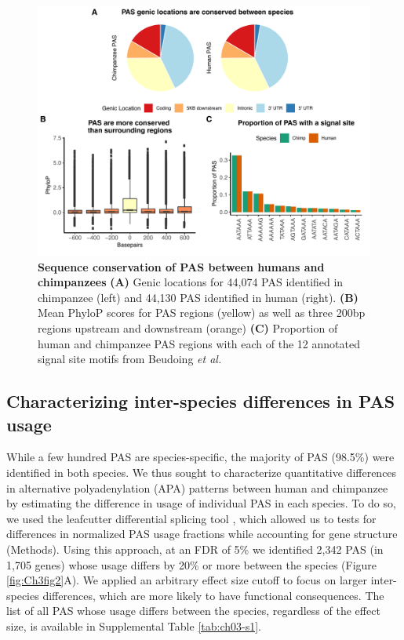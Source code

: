  
\begin{figure}
\centering
\includegraphics[width=5in]{img/ch03/fig1.pdf}
\caption[Sequence conservation of PAS between humans and chimpanzees]{\textbf{Sequence conservation of PAS between humans and chimpanzees} \small {\bf (A)} Genic locations for 44,074 PAS identified in chimpanzee (left) and 44,130 PAS identified in human (right). {\bf (B)} Mean PhyloP scores for PAS regions (yellow) as well as three 200bp regions upstream and downstream (orange) {\bf (C)} Proportion of human and chimpanzee PAS regions with each of the 12 annotated signal site motifs from Beudoing \emph{et al.}\citep{beaudoing_patterns_2000}} 
\label{fig:Ch3fig1}
\end{figure}
 
 
\subsection{Characterizing inter-species differences in PAS usage}\label{diffHC}

While a few hundred PAS are species-specific, the majority of PAS (98.5\%) were identified in both species. We thus sought to characterize quantitative differences in alternative polyadenylation (APA) patterns between human and chimpanzee by estimating the difference in usage of individual PAS in each species. To do so, we used the leafcutter differential splicing tool \citep{li_annotation-free_2018}, which allowed us to tests for differences in normalized PAS usage fractions while accounting for gene structure (Methods). Using this approach, at an FDR of 5\% we identified 2,342 PAS (in 1,705 genes) whose usage differs by 20\% or more between the species (Figure \ref{fig:Ch3fig2}A). We applied an arbitrary effect size cutoff to focus on larger inter-species differences, which are more likely to have functional consequences. The list of all PAS whose usage differs between the species, regardless of the effect size, is available in Supplemental Table \ref{tab:ch03-s1}. 



